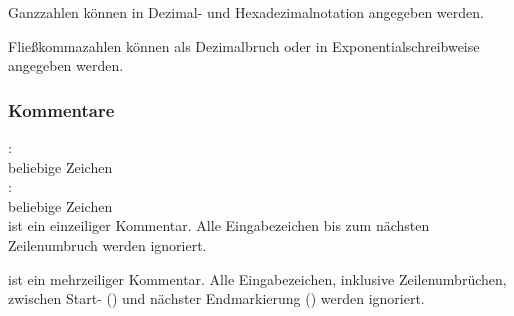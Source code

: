 Ganzzahlen können in Dezimal- und Hexadezimalnotation angegeben werden.

Fließkommazahlen können als Dezimalbruch oder in Exponentialschreibweise
angegeben werden.


\subsubsection{Kommentare}\label{Kommentare}
:\label{COMMENT}\\
\hspace*{1cm}\Gt{//} beliebige Zeichen \Gspace{}\\
:\label{ML_COMMENT}\\
\hspace*{1cm}\Gt{\kwMlcStart} beliebige Zeichen \Gt{\kwMlcEnd}\\

  ist ein einzeiliger Kommentar. Alle Eingabezeichen bis zum nächsten Zeilenumbruch
 werden ignoriert.

  ist ein mehrzeiliger Kommentar. Alle Eingabezeichen, inklusive Zeilenumbrüchen,
 zwischen Start- (\kwMlcStart) und nächster Endmarkierung (\kwMlcEnd) werden ignoriert.

